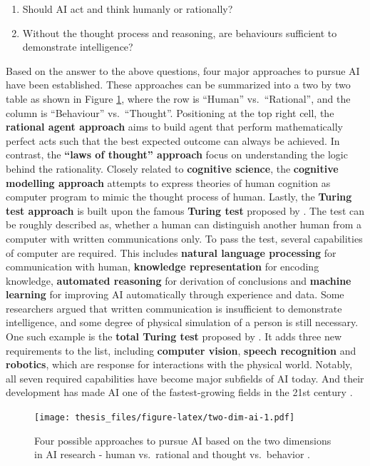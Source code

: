 \documentclass{monashthesis}
\theoremstyle{definition}
\theoremstyle{definition}
\theoremstyle{definition}
\theoremstyle{definition}
\theoremstyle{remark}
\begin{document}
\begin{enumerate}
\def\labelenumi{\arabic{enumi}.}
\tightlist
\item
  Should AI act and think humanly or rationally?
\item
  Without the thought process and reasoning, are behaviours sufficient to demonstrate intelligence?
\end{enumerate}

Based on the answer to the above questions, four major approaches to pursue AI have been established. These approaches can be summarized into a two by two table as shown in Figure \ref{fig:two-dim-ai}, where the row is ``Human'' vs.~``Rational'', and the column is ``Behaviour'' vs.~``Thought''. Positioning at the top right cell, the \textbf{rational agent approach} aims to build agent that perform mathematically perfect acts such that the best expected outcome can always be achieved. In contrast, the \textbf{``laws of thought'' approach} focus on understanding the logic behind the rationality. Closely related to \textbf{cognitive science}, the \textbf{cognitive modelling approach} attempts to express theories of human cognition as computer program to mimic the thought process of human. Lastly, the \textbf{Turing test approach} is built upon the famous \textbf{Turing test} proposed by \textcite{turing_computing_1950}. The test can be roughly described as, whether a human can distinguish another human from a computer with written communications only. To pass the test, several capabilities of computer are required. This includes \textbf{natural language processing} for communication with human, \textbf{knowledge representation} for encoding knowledge, \textbf{automated reasoning} for derivation of conclusions and \textbf{machine learning} for improving AI automatically through experience and data. Some researchers argued that written communication is insufficient to demonstrate intelligence, and some degree of physical simulation of a person is still necessary. One such example is the \textbf{total Turing test} proposed by \textcite{harnad_other_1991}. It adds three new requirements to the list, including \textbf{computer vision}, \textbf{speech recognition} and \textbf{robotics}, which are response for interactions with the physical world. Notably, all seven required capabilities have become major subfields of AI today. And their development has made AI one of the fastest-growing fields in the 21st century \autocite{russell_artificial_2002}.

\begin{figure}
\centering
\texttt{[image: thesis\_files/figure-latex/two-dim-ai-1.pdf]}
\caption{\label{fig:two-dim-ai}Four possible approaches to pursue AI based on the two dimensions in AI research - human vs.~rational and thought vs.~behavior \autocite{russell_artificial_2002}.}
\end{figure}
\end{document}
